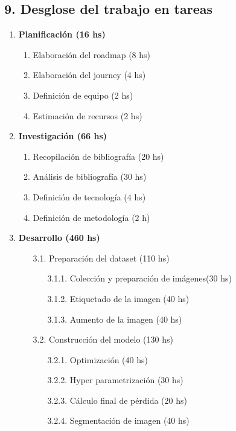 \documentclass[
11pt, %
]{charter}
\begin{document}
\begin{•}
\section{9. Desglose del trabajo en tareas}
\label{sec:wbs}

\begin{enumerate}
\item \textbf{Planificación (16 hs)}

	\begin{enumerate}
	\item Elaboración del roadmap (8 hs)
	\item Elaboración del journey (4 hs)
	\item Definición de equipo (2 hs)
	\item Estimación de recursos (2 hs)
	\end{enumerate}
	
\item \textbf{Investigación (66 hs)}

	\begin{enumerate}
	\item Recopilación de bibliografía (20 hs)
	\item Análisis de bibliografía (30 hs)
	\item Definición de tecnología (4 hs)
	\item Definición de metodología (2 h)
	\end{enumerate}
	
\item \textbf{Desarrollo (460 hs)}

	\begin{enumerate}
	\item [3.1.] Preparación del dataset (110 hs)
	
		\begin{enumerate}
		\item [3.1.1.]Colección y preparación de imágenes(30 hs)
		\item [3.1.2.]Etiquetado de la imagen (40 hs)
		\item [3.1.3.]Aumento de la imagen (40 hs)
		\end{enumerate}

	
	\item [3.2.] Construcción del modelo (130 hs)
	
		\begin{enumerate}
		\item [3.2.1.]Optimización (40 hs)
		\item [3.2.2.]Hyper parametrización (30 hs)
		\item [3.2.3.]Cálculo final de pérdida (20 hs)
		\item [3.2.4.]Segmentación de imagen (40 hs)
		\end{enumerate}
		

\end{enumerate}
\end{enumerate}
\end{•}
\end{document}
